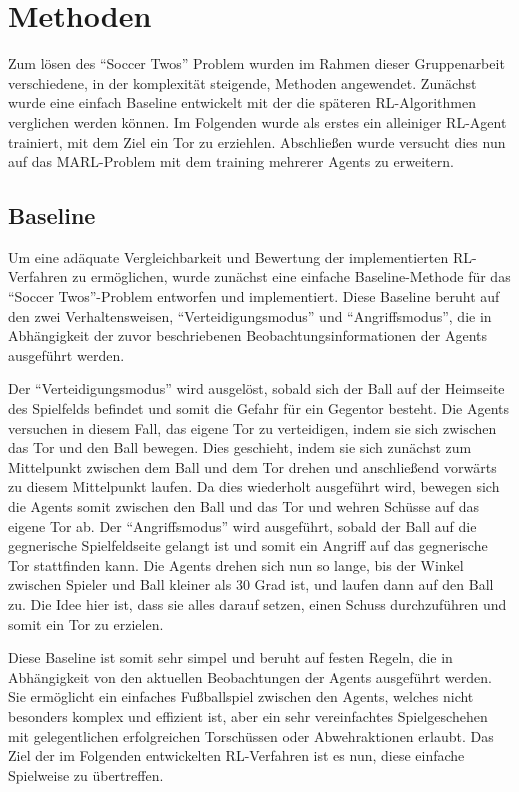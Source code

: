 \chapter{Methoden} \label{chapter:2}

Zum lösen des ``Soccer Twos'' Problem wurden im Rahmen dieser Gruppenarbeit verschiedene, in der komplexität steigende, Methoden angewendet. Zunächst wurde eine einfach Baseline entwickelt mit der die späteren \ac{RL}-Algorithmen verglichen werden können. Im Folgenden wurde als erstes ein alleiniger \ac{RL}-Agent trainiert, mit dem Ziel ein Tor zu erziehlen. Abschließen wurde versucht dies nun auf das \ac{MARL}-Problem mit dem training mehrerer Agents zu erweitern. %

\section{Baseline}

Um eine adäquate Vergleichbarkeit und Bewertung der implementierten \ac{RL}-Verfahren zu ermöglichen, wurde zunächst eine einfache Baseline-Methode für das ``Soccer Twos''-Problem entworfen und implementiert. Diese Baseline beruht auf den zwei Verhaltensweisen, ``Verteidigungsmodus'' und ``Angriffsmodus'', die in Abhängigkeit der zuvor beschriebenen Beobachtungsinformationen der Agents ausgeführt werden.

Der ``Verteidigungsmodus'' wird ausgelöst, sobald sich der Ball auf der Heimseite des Spielfelds befindet und somit die Gefahr für ein Gegentor besteht. Die Agents versuchen in diesem Fall, das eigene Tor zu verteidigen, indem sie sich zwischen das Tor und den Ball bewegen. Dies geschieht, indem sie sich zunächst zum Mittelpunkt zwischen dem Ball und dem Tor drehen und anschließend vorwärts zu diesem Mittelpunkt laufen. Da dies wiederholt ausgeführt wird, bewegen sich die Agents somit zwischen den Ball und das Tor und wehren Schüsse auf das eigene Tor ab.
Der ``Angriffsmodus'' wird ausgeführt, sobald der Ball auf die gegnerische Spielfeldseite gelangt ist und somit ein Angriff auf das gegnerische Tor stattfinden kann. Die Agents drehen sich nun so lange, bis der Winkel zwischen Spieler und Ball kleiner als 30 Grad ist, und laufen dann auf den Ball zu. Die Idee hier ist, dass sie alles darauf setzen, einen Schuss durchzuführen und somit ein Tor zu erzielen.

Diese Baseline ist somit sehr simpel und beruht auf festen Regeln, die in Abhängigkeit von den aktuellen Beobachtungen der Agents ausgeführt werden. Sie ermöglicht ein einfaches Fußballspiel zwischen den Agents, welches nicht besonders komplex und effizient ist, aber ein sehr vereinfachtes Spielgeschehen mit gelegentlichen erfolgreichen Torschüssen oder Abwehraktionen erlaubt. Das Ziel der im Folgenden entwickelten \ac{RL}-Verfahren ist es nun, diese einfache Spielweise zu übertreffen.


